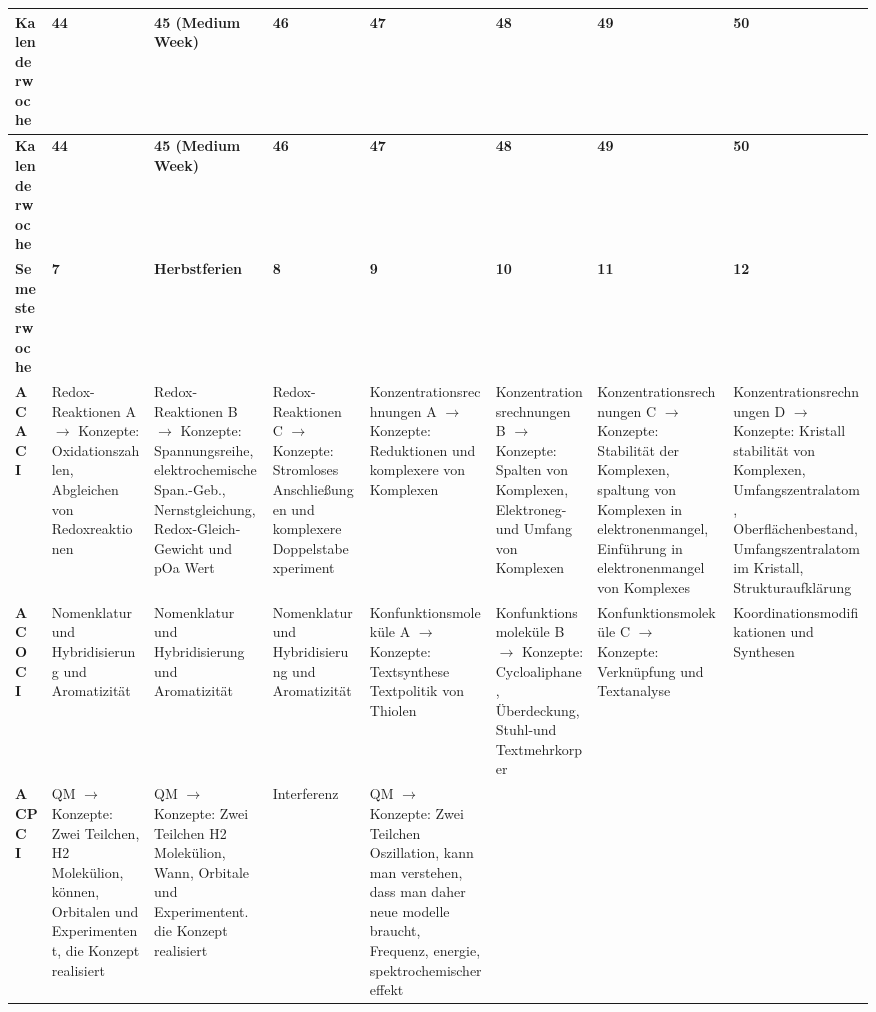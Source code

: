 \documentclass[a4paper]{article}
\begin{document}
\begin{longtable}{|p{2.5cm}|*{7}{p{1.9cm}|}}
\hline
\textbf{Kalenderwoche} & \textbf{44} & \textbf{45 (Medium Week)} & \textbf{46} & \textbf{47} & \textbf{48} & \textbf{49} & \textbf{50} \\
\hline
\endfirsthead

\hline
\textbf{Kalenderwoche} & \textbf{44} & \textbf{45 (Medium Week)} & \textbf{46} & \textbf{47} & \textbf{48} & \textbf{49} & \textbf{50} \\
\hline
\endhead

\textbf{Semesterwoche} & \textbf{7} & \textbf{Herbstferien} & \textbf{8} & \textbf{9} & \textbf{10} & \textbf{11} & \textbf{12} \\
\hline

\textbf{ACAC I} & Redox-Reaktionen A $\rightarrow$ Konzepte: Oxidationszahlen, Abgleichen von Redoxreaktionen & Redox-Reaktionen B $\rightarrow$ Konzepte: Spannungsreihe, elektrochemische Span.-Geb., Nernstgleichung, Redox-Gleich-Gewicht und pOa Wert & Redox-Reaktionen C $\rightarrow$ Konzepte: Stromloses Anschließungen und komplexere Doppelstabexperiment & Konzentrationsrechnungen A $\rightarrow$ Konzepte: Reduktionen und komplexere von Komplexen & Konzentrationsrechnungen B $\rightarrow$ Konzepte: Spalten von Komplexen, Elektroneg- und Umfang von Komplexen & Konzentrationsrechnungen C $\rightarrow$ Konzepte: Stabilität der Komplexen, spaltung von Komplexen in elektronenmangel, Einführung in elektronenmangel von Komplexes & Konzentrationsrechnungen D $\rightarrow$ Konzepte: Kristall stabilität von Komplexen, Umfangszentralatom, Oberflächenbestand, Umfangszentralatom im Kristall, Strukturaufklärung \\
\hline

\textbf{ACOC I} & Nomenklatur und Hybridisierung und Aromatizität & Nomenklatur und Hybridisierung und Aromatizität & Nomenklatur und Hybridisierung und Aromatizität & Konfunktionsmoleküle A $\rightarrow$ Konzepte: Textsynthese Textpolitik von Thiolen & Konfunktionsmoleküle B $\rightarrow$ Konzepte: Cycloaliphane, Überdeckung, Stuhl-und Textmehrkorper & Konfunktionsmoleküle C $\rightarrow$ Konzepte: Verknüpfung und Textanalyse & Koordinationsmodifikationen und Synthesen \\
\hline

\textbf{ACPC I} & QM $\rightarrow$ Konzepte: Zwei Teilchen, H2 Molekülion, können, Orbitalen und Experimentent, die Konzept realisiert & QM $\rightarrow$ Konzepte: Zwei Teilchen H2 Molekülion, Wann, Orbitale und Experimentent. die Konzept realisiert & Interferenz & QM $\rightarrow$ Konzepte: Zwei Teilchen Oszillation, kann man verstehen, dass man daher neue modelle braucht, Frequenz, energie, spektrochemischer effekt & & \\
\hline


\end{longtable}
\end{document}
